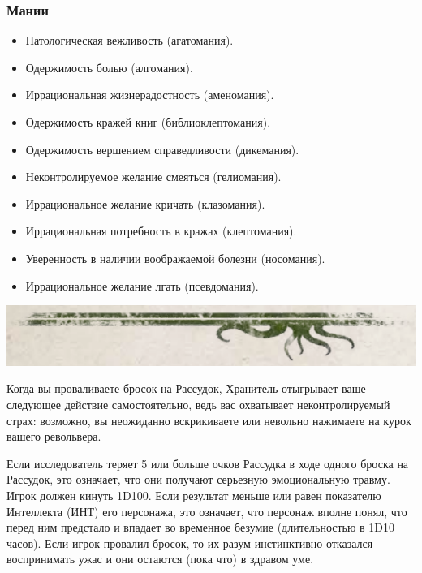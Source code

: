 \documentclass[letterpaper,twocolumn,openany, twoside, 11pt, usenames]{cocbook}
\begin{document}
\begin{fullcocpaperbox}{}{}
\begin{multicols}{2}
  \subsubsection*{Мании}
  \begin{itemize}[leftmargin=4mm]
  \item Патологическая вежливость (агатомания).
  \item Одержимость болью (алгомания).
  \item Иррациональная жизнерадостность (аменомания).
  \item Одержимость кражей книг (библиоклептомания).
  \item Одержимость вершением справедливости (дикемания).
  \item Неконтролируемое желание смеяться (гелиомания).
  \item Иррациональное желание кричать (клазомания).
  \item Иррациональная потребность в кражах (клептомания).
  \item Уверенность в наличии воображаемой болезни (носомания).
  \item Иррациональное желание лгать (псевдомания).
\end{itemize}
  \end{multicols}
  \includegraphics[width=\linewidth]{img/bottom.png}
\end{fullcocpaperbox}
Когда вы проваливаете бросок на Рассудок, Хранитель отыгрывает ваше следующее действие самостоятельно, ведь вас охватывает неконтролируемый страх: возможно, вы неожиданно вскрикиваете или невольно нажимаете на курок вашего револьвера.

Если исследователь теряет 5 или больше очков Рассудка в ходе одного броска на Рассудок, это означает, что они получают серьезную эмоциональную травму. Игрок должен кинуть 1D100. Если результат меньше или равен показателю Интеллекта (ИНТ) его персонажа, это означает, что персонаж вполне понял, что перед ним предстало и впадает во временное безумие (длительностью в  1D10 часов). Если игрок провалил бросок, то их разум инстинктивно отказался воспринимать ужас и они остаются (пока что) в здравом уме.
\end{document}
